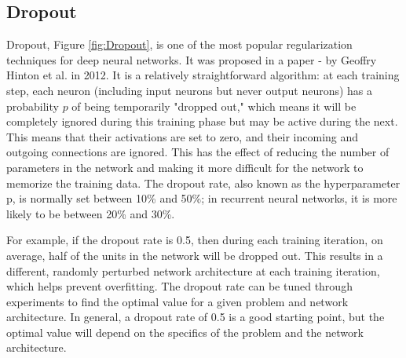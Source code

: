 \subsection{Dropout}
Dropout, Figure \ref{fig:Dropout}, is one of the most popular regularization techniques for deep neural networks. It was proposed in a paper - by Geoffry Hinton et al. in 2012. 
It is a relatively straightforward algorithm: at each training step, each neuron (including input neurons but never output neurons) has a probability $p$ of being temporarily "dropped out," which means it will be completely ignored during this training phase but may be active during the next. This means that their activations are set to zero, and their incoming and outgoing connections are ignored. This has the effect of reducing the number of parameters in the network and making it more difficult for the network to memorize the training data. The dropout rate, also known as the hyperparameter p, is normally set between 10\% and 50\%; in recurrent neural networks, it is more likely to be between 20\% and 30\%. 



For example, if the dropout rate is 0.5, then during each training iteration, on average, half of the units in the network will be dropped out. This results in a different, randomly perturbed network architecture at each training iteration, which helps prevent overfitting. The dropout rate can be tuned through experiments to find the optimal value for a given problem and network architecture. In general, a dropout rate of 0.5 is a good starting point, but the optimal value will depend on the specifics of the problem and the network architecture.